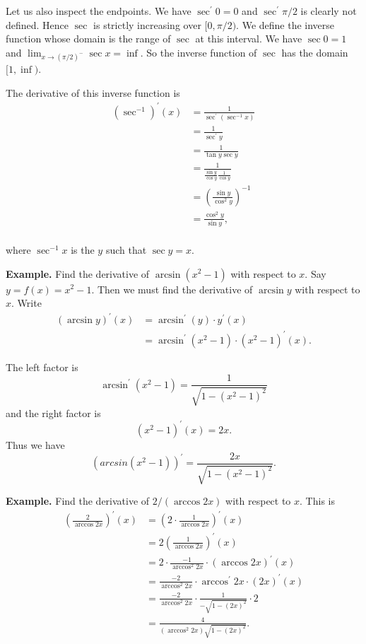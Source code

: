       Let us also inspect the endpoints. We have $\sec^\prime 0 = 0$ and $\sec^\prime \pi/2$ is clearly not defined.
      Hence $\sec$ is strictly increasing over $[0, \pi/2)$. We define the inverse function whose domain is the range of $\sec$ at this interval. We have $\sec 0 = 1$ and $\lim_{x\to(\pi/2)^-} \sec x = \inf$. So the inverse function of $\sec$ has the domain $[1, \inf)$.

          The derivative of this inverse function is
          \begin{align*}
            (\sec^{-1})^\prime (x) &= \frac{1}{\sec^\prime (\sec^{-1} x)}\\
            &= \frac{1}{\sec^\prime y}\\
            &= \frac{1}{\tan y \sec y}\\
            &= \frac{1}{\frac{\sin y}{\cos y} \frac{1}{\cos y}}\\
            &= (\frac{\sin y}{\cos^2 y})^{-1}\\
            &= \frac{\cos^2 y}{\sin y},\\
          \end{align*}

          where $\sec^{-1} x$ is the $y$ such that $\sec y = x$.

          \textbf{Example.} Find the derivative of $\arcsin(x^2 - 1)$ with respect to $x$. Say $y = f(x) = x^2 - 1$. Then we must find the derivative of $\arcsin y$ with respect to $x$. Write
          \begin{align*}
            (\arcsin y)^\prime(x) &= \arcsin^\prime(y) \cdot y^\prime(x)\\
            &= \arcsin^\prime(x^2 - 1) \cdot (x^2 - 1)^\prime(x).
          \end{align*}

          The left factor is
          \[\arcsin^\prime(x^2 - 1) = \frac{1}{\sqrt{1 - (x^2 - 1)^2}}\]
          and the right factor is
          \[(x^2 - 1)^\prime(x) = 2x.\]
          Thus we have
          \[(arcsin(x^2 - 1))^\prime = \frac{2x}{\sqrt{1 - (x^2 - 1)^2}}.\]

          \textbf{Example.} Find the derivative of $2/(\arccos 2x)$ with respect to $x$. This is
          \begin{align*}
            (\frac{2}{\arccos 2x})^\prime(x) &= (2 \cdot \frac{1}{\arccos 2x})^\prime(x)\\
            &= 2(\frac{1}{\arccos 2x})^\prime(x)\\
            &= 2 \cdot \frac{-1}{\arccos^2 2x} \cdot (\arccos 2x)^\prime(x)\\
            &= \frac{-2}{\arccos^2 2x} \cdot \arccos^\prime 2x \cdot (2x)^\prime(x)\\
            &= \frac{-2}{\arccos^2 2x} \cdot \frac{1}{-\sqrt{1 - (2x)^2}} \cdot 2\\
            &= \frac{4}{(\arccos^2 2x)\sqrt{1 - (2x)^2}}.
          \end{align*}
           
